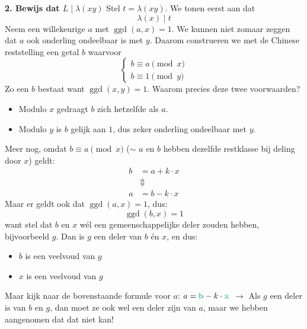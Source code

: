 \textbf{2. Bewijs dat $L \mid \lambda(xy)$}\newline
Stel $t = \lambda(xy)$. We tonen eerst aan dat
\begin{equation*}
    \lambda(x) \mid t
\end{equation*}
Neem een willekeurige $a$ met $\operatorname{ggd}(a,x) = 1$. We kunnen niet zomaar zeggen dat $a$ ook onderling ondeelbaar is met $y$. Daarom construeren we met de Chinese reststelling een getal $b$ waarvoor
\begin{equation*}
    \begin{cases}
        b \equiv a \pmod x \\
        b \equiv 1 \pmod y
    \end{cases}
\end{equation*}
Zo een $b$ bestaat want $\operatorname{ggd}(x,y) = 1$. Waarom precies deze twee voorwaarden?
\begin{itemize}
    \item Modulo $x$ gedraagt $b$ zich hetzelfde als $a$.
    \item Modulo $y$ is $b$ gelijk aan $1$, dus zeker onderling ondeelbaar met $y$.
\end{itemize}
Meer nog, omdat $b \equiv a \pmod x$ ($\sim$ $a$ en $b$ hebben dezelfde restklasse bij deling door $x$) geldt:
\begin{equation*}
    \begin{aligned}
        b &= a + k \cdot x \\
        &\Updownarrow \\
        a &= b - k \cdot x
    \end{aligned}
\end{equation*}
Maar er geldt ook dat $\operatorname{ggd}(a,x) = 1$, dus:
\begin{equation*}
    \operatorname{ggd}(b, x) = 1
\end{equation*}
want stel dat $b$ en $x$ wél een gemeenschappelijke deler zouden hebben, bijvoorbeeld $g$. Dan is $g$ een deler van $b$ én $x$, en dus:
\begin{itemize}
    \item $b$ is een veelvoud van $g$
    \item $x$ is een veelvoud van $g$
\end{itemize}
Maar kijk naar de bovenstaande formule voor $a$: $a = \textcolor{Aquamarine}{\mathbf{b}} - k \cdot \textcolor{Aquamarine}{\mathbf{x}}$ \newline
$\to$ Als $g$ een deler is van $b$ en $g$, dan moet ze ook wel een deler zijn van $a$, maar we hebben aangenomen dat dat niet kan!

